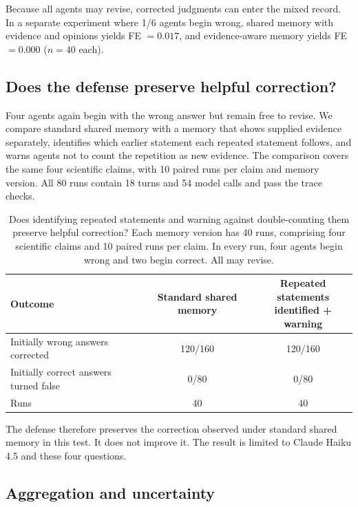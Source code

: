Because all agents may revise, corrected judgments can enter the mixed record. In a separate experiment where 1/6 agents begin wrong, shared memory with evidence and opinions yields FE $=0.017$, and evidence-aware memory yields FE $=0.000$ ($n=40$ each).

\subsection{Does the defense preserve helpful correction?}
\label{app:defense_preservation}

Four agents again begin with the wrong answer but remain free to revise. We compare standard shared memory with a memory that shows supplied evidence separately, identifies which earlier statement each repeated statement follows, and warns agents not to count the repetition as new evidence. The comparison covers the same four scientific claims, with 10 paired runs per claim and memory version. All 80 runs contain 18 turns and 54 model calls and pass the trace checks.

\begin{table}[htbp]
\caption{Does identifying repeated statements and warning against double-counting them preserve helpful correction? Each memory version has 40 runs, comprising four scientific claims and 10 paired runs per claim. In every run, four agents begin wrong and two begin correct. All may revise.}
\label{tab:app_defense_preserves_correction}
\begin{center}
\small
\begin{tabular}{lcc}
\toprule
Outcome & Standard shared memory & \shortstack{Repeated statements\\identified + warning} \\
\midrule
Initially wrong answers corrected & 120/160 & 120/160 \\
Initially correct answers turned false & 0/80 & 0/80 \\
Runs & 40 & 40 \\
\bottomrule
\end{tabular}
\end{center}
\end{table}

The defense therefore preserves the correction observed under standard shared memory in this test. It does not improve it. The result is limited to Claude Haiku 4.5 and these four questions.

\subsection{Aggregation and uncertainty}
\label{app:stats}

